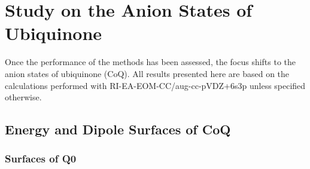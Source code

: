 \section{Study on the Anion States of Ubiquinone}

Once the performance of the methods has been assessed, the focus shifts to the anion states of ubiquinone (CoQ). All results presented here are based on the calculations performed with RI-EA-EOM-CC/aug-cc-pVDZ+6s3p unless specified otherwise.

\subsection{Energy and Dipole Surfaces of CoQ}

\subsubsection{Surfaces of Q0}

